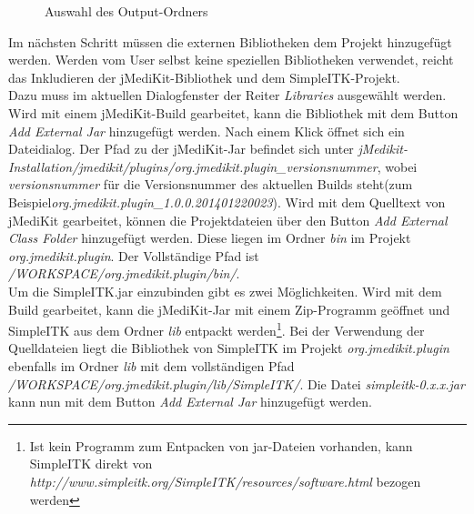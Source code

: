 \begin{figure}[H]
  \vspace{0.5cm}
  \centering
  \caption{Auswahl des Output-Ordners}
  \label{binfolder}
  \vspace{0.5cm}
\end{figure}

Im nächsten Schritt müssen die externen Bibliotheken dem Projekt hinzugefügt werden. Werden vom User selbst keine speziellen Bibliotheken verwendet, reicht das Inkludieren der jMediKit-Bibliothek und dem SimpleITK-Projekt.\\
Dazu muss im aktuellen Dialogfenster der Reiter \textit{Libraries} ausgewählt werden. Wird mit einem jMediKit-Build gearbeitet, kann die Bibliothek mit dem Button \textit{Add External Jar} hinzugefügt werden. Nach einem Klick öffnet sich ein Dateidialog. Der Pfad zu der jMediKit-Jar befindet sich unter \newline
\textit{jMedikit-Installation/}\textit{jmedikit/}\textit{plugins/}\textit{org.jmedikit.plugin\_versionsnummer}, wobei \textit{versionsnummer} für die Versionsnummer des aktuellen Builds steht(zum Beispiel\newline \textit{org.jmedikit.plugin\_1.0.0.201401220023}). Wird mit dem Quelltext von jMediKit gearbeitet, können die Projektdateien über den Button \textit{Add External Class Folder} hinzugefügt werden. Diese liegen im Ordner \textit{bin} im Projekt \textit{org.jmedikit.plugin}. Der Vollständige Pfad ist \textit{/WORKSPACE/org.jmedikit.plugin/bin/}.\\
Um die SimpleITK.jar einzubinden gibt es zwei Möglichkeiten. Wird mit dem Build gearbeitet, kann die jMediKit-Jar mit einem Zip-Programm geöffnet und SimpleITK aus dem Ordner \textit{lib} entpackt werden\footnote{Ist kein Programm zum Entpacken von jar-Dateien vorhanden, kann SimpleITK direkt von \textit{http://www.simpleitk.org/SimpleITK/resources/software.html} bezogen werden}. Bei der Verwendung der Quelldateien liegt die Bibliothek von SimpleITK im Projekt \textit{org.jmedikit.plugin} ebenfalls im Ordner \textit{lib} mit dem vollständigen Pfad \textit{/WORKSPACE/org.jmedikit.plugin/lib/SimpleITK/}. Die Datei \textit{simpleitk-0.x.x.jar} kann nun mit dem Button \textit{Add External Jar} hinzugefügt werden.

